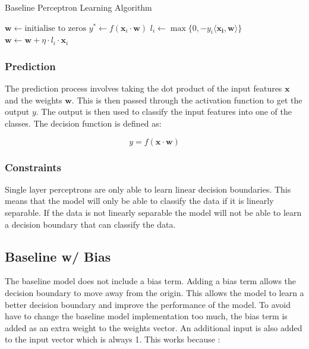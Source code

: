 \begin{algorithm}
  \caption{Baseline Perceptron Learning Algorithm}
  \begin{algorithmic}
    \State $\boldsymbol{w} \gets \text{initialise to zeros}$
      \State $y^* \gets f(\boldsymbol{x}_i \cdot \boldsymbol{w})$
      \State $l_i \gets \max\{0, -y_i \langle \boldsymbol{x_i}, \boldsymbol{w} \rangle\}$
      \State $\boldsymbol{w} \gets \boldsymbol{w} + \eta \cdot l_i \cdot \boldsymbol{x}_i$
    \EndFor
  \end{algorithmic}
\end{algorithm}

\subsubsection{Prediction}

The prediction process involves taking the dot product of the input features $\boldsymbol{x}$ and the weights $\boldsymbol{w}$. This is then passed through the activation function to get the output $y$. The output is then used to classify the input features into one of the classes. The decision function is defined as:

\[
  y = f(\boldsymbol{x} \cdot \boldsymbol{w})
\]

\subsubsection{Constraints}

Single layer perceptrons are only able to learn linear decision boundaries. This means that the model will only be able to classify the data if it is linearly separable. If the data is not linearly separable the model will not be able to learn a decision boundary that can classify the data. 


\subsection{Baseline w/ Bias}

The baseline model does not include a bias term. Adding a bias term allows the decision boundary to move away from the origin. This allows the model to learn a better decision boundary and improve the performance of the model. 
To avoid have to change the baseline model implementation too much, the bias term is added as an extra weight to the weights vector. An additional input is also added to the input vector which is always 1. This works because \cite{Marsland2015}:


